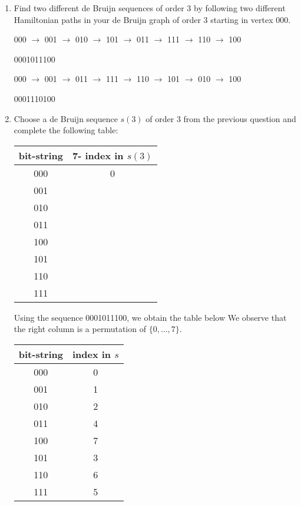 \documentclass[11pt]{article}
\begin{document}
\begin{enumerate}\addtocounter{enumi}{3}
	\item Find two different de Bruijn sequences of order $3$ by following two different Hamiltonian paths in your de Bruijn graph of order $3$ starting in vertex $000$.
	
	\begin{solution}
		
		000 $\rightarrow$ 001 $\rightarrow$ 010 $\rightarrow$ 101 $\rightarrow$ 011
		$\rightarrow$ 111 $\rightarrow$ 110 $\rightarrow$ 100
		
		0001011100
		
		000 $\rightarrow$ 001 $\rightarrow$ 011 $\rightarrow$ 111 $\rightarrow$ 110
		$\rightarrow$ 101 $\rightarrow$ 010 $\rightarrow$ 100
		
		0001110100
		
	\end{solution}
	
	\item Choose a de Bruijn sequence $s(3)$ of order $3$ from the previous question and complete the following table:
	\begin{center}
		\begin{tabular}{ c | c }
			bit-string & 7- index in $s(3)$ \\
			\hline
			000 & 0 \\
			001 & \\
			010 & \\
			011 & \\
			100 & \\
			101 & \\
			110 & \\
			111 & \\
		\end{tabular}
	\end{center}

\begin{solution}
	
	Using the sequence 0001011100, we obtain the table below
	We observe that the right column is a permutation of $\{0,\ldots,7\}$.
	
	\begin{center}
		\begin{tabular}{ c | c }
			bit-string & index in $s$ \\
			\hline
			000 & 0 \\
			001 & 1 \\
			010 & 2 \\
			011 & 4 \\
			100 & 7 \\
			101 & 3 \\
			110 & 6 \\
			111 & 5 \\
		\end{tabular}
	\end{center}
\end{solution}


\end{enumerate}
\end{document}

